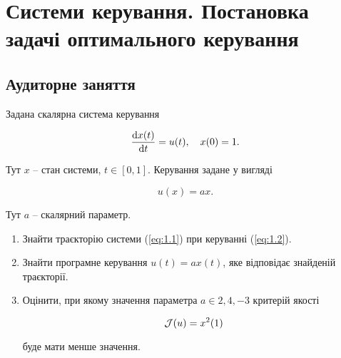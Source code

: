 \section{Системи керування. Постановка задачі оптимального керування}

\subsection*{Аудиторне заняття}

\begin{problem}
	Задана скалярна система керування 
	
	\begin{equation}
		\label{eq:1.1}

		\frac{\diff x(t)}{\diff t} = u(t), \quad x(0) = 1.
	\end{equation}

	Тут $x$ -- стан системи, $t \in [0, 1]$. Керування задане у вигляді

	\begin{equation}
		\label{eq:1.2}

		u(x) = a x.
	\end{equation}

	Тут $a$ -- скалярний параметр.

	\begin{enumerate}
		\item Знайти траєкторію системи (\ref{eq:1.1}) при керуванні (\ref{eq:1.2}).

		\item Знайти програмне керування $u(t) = a x (t)$, яке відповідає знайденій траєкторії. 

		\item Оцінити, при якому значення параметра $a \in {2, 4, -3}$ критерій якості 

		\[ \mathcal{J}(u) = x^2 (1) \]

		буде мати менше значення.
	\end{enumerate}
\end{problem}

